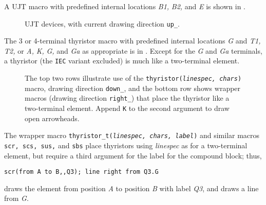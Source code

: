 \pagebreak
A UJT macro with predefined internal locations {\sl B1,} {\sl B2,}
and {\sl E} is shown in .
\begin{figure}[H]
   
   \caption{UJT devices, with current drawing direction {\tt up\_}. }
   \label{ujt}
   \end{figure}


The 3 or 4-terminal thyristor macro with predefined internal locations
 {\sl G} and {\sl T1,} {\sl T2,} or
 {\sl A,} {\sl K,} {\sl G,} and {\sl Ga} 
 as appropriate is in .
Except for the {\sl G} and {\sl Ga} terminals,
a thyristor (the {\tt IEC} variant excluded)
is much like a two-terminal element.
\begin{figure}[H]
   
   \vspace*{-1ex}
   \caption{The top two rows illustrate use of the
    {\tt thyristor({\sl linespec, chars})} macro,
    drawing direction {\tt down\_}, and the bottom row shows wrapper
    macros (drawing direction {\tt right\_}) that place
    the thyristor like a two-terminal element. Append {\tt K}
    to the second argument to draw open arrowheads.}
   \label{thyristor}
   \end{figure}
\enlargethispage{\baselineskip}
The wrapper macro
{\tt thyristor\_t({\sl linespec, chars, label})} and similar macros
{\tt scr, scs, sus,} and {\tt sbs}
place thyristors using {\sl linespec} as for a two-terminal element,
but require a third argument for the label for the compound block; thus,

{\tt scr(from A to B,{,}Q3); line right from Q3.G}

\noindent
draws the element from position {\sl A} to position {\sl B} with label
{\sl Q3}, and draws a line from {\sl G}.

